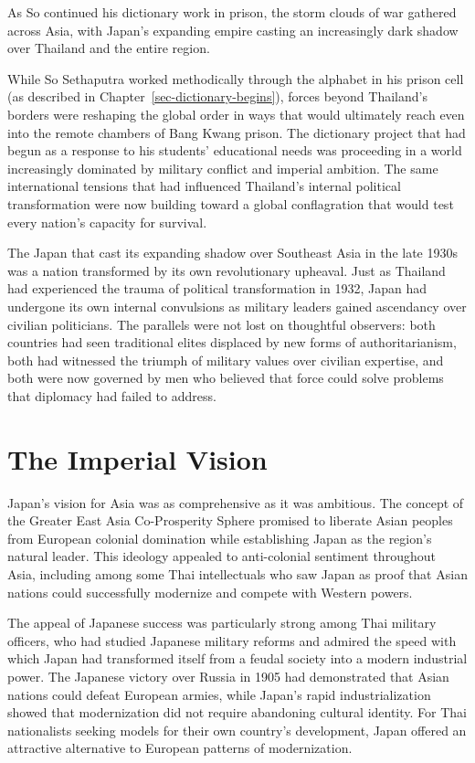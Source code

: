 \documentclass[
  Letterpaper,
]{scrbook}
\begin{document}
As So continued his dictionary work in prison, the storm clouds of war
gathered across Asia, with Japan's expanding empire casting an
increasingly dark shadow over Thailand and the entire region.

While So Sethaputra worked methodically through the alphabet in his
prison cell (as described in Chapter~\ref{sec-dictionary-begins}),
forces beyond Thailand's borders were reshaping the global order in ways
that would ultimately reach even into the remote chambers of Bang Kwang
prison. The dictionary project that had begun as a response to his
students' educational needs was proceeding in a world increasingly
dominated by military conflict and imperial ambition. The same
international tensions that had influenced Thailand's internal political
transformation were now building toward a global conflagration that
would test every nation's capacity for survival.

The Japan that cast its expanding shadow over Southeast Asia in the late
1930s was a nation transformed by its own revolutionary upheaval. Just
as Thailand had experienced the trauma of political transformation in
1932, Japan had undergone its own internal convulsions as military
leaders gained ascendancy over civilian politicians. The parallels were
not lost on thoughtful observers: both countries had seen traditional
elites displaced by new forms of authoritarianism, both had witnessed
the triumph of military values over civilian expertise, and both were
now governed by men who believed that force could solve problems that
diplomacy had failed to address.

\section{The Imperial Vision}\label{the-imperial-vision}

Japan's vision for Asia was as comprehensive as it was ambitious. The
concept of the Greater East Asia Co-Prosperity Sphere promised to
liberate Asian peoples from European colonial domination while
establishing Japan as the region's natural leader. This ideology
appealed to anti-colonial sentiment throughout Asia, including among
some Thai intellectuals who saw Japan as proof that Asian nations could
successfully modernize and compete with Western powers.

The appeal of Japanese success was particularly strong among Thai
military officers, who had studied Japanese military reforms and admired
the speed with which Japan had transformed itself from a feudal society
into a modern industrial power. The Japanese victory over Russia in 1905
had demonstrated that Asian nations could defeat European armies, while
Japan's rapid industrialization showed that modernization did not
require abandoning cultural identity. For Thai nationalists seeking
models for their own country's development, Japan offered an attractive
alternative to European patterns of modernization.
\end{document}
